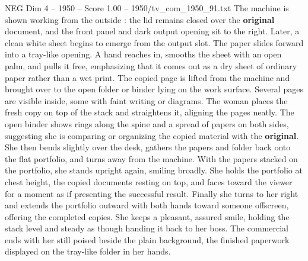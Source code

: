 \begin{textsample}{NEG Dim 4 – 1950 – Score 1.00 – 1950/tv\_com\_1950\_91.txt}
The machine is shown working from the outside : the lid remains closed over the \textbf{original} document, and the front panel and dark output opening sit to the right.
Later, a clean white sheet begins to emerge from the output slot.
The paper slides forward into a tray-like opening.
A hand reaches in, smooths the sheet with an open palm, and pulls it free, emphasizing that it comes out as a dry sheet of ordinary paper rather than a wet print.
The copied page is lifted from the machine and brought over to the open folder or binder lying on the work surface.
Several pages are visible inside, some with faint writing or diagrams.
The woman places the fresh copy on top of the stack and straightens it, aligning the pages neatly.
The open binder shows rings along the spine and a spread of papers on both sides, suggesting she is comparing or organizing the copied material with the \textbf{original}.
She then bends slightly over the desk, gathers the papers and folder back onto the flat portfolio, and turns away from the machine.
With the papers stacked on the portfolio, she stands upright again, smiling broadly.
She holds the portfolio at chest height, the copied documents resting on top, and faces toward the viewer for a moment as if presenting the successful result.
Finally she turns to her right and extends the portfolio outward with both hands toward someone offscreen, offering the completed copies.
She keeps a pleasant, assured smile, holding the stack level and steady as though handing it back to her boss.
The commercial ends with her still poised beside the plain background, the finished paperwork displayed on the tray-like folder in her hands.

\end{textsample}
